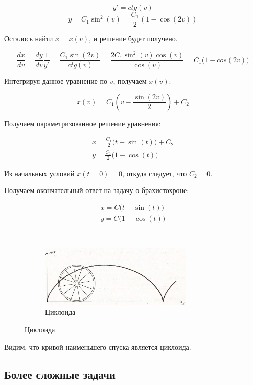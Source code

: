 \documentclass[12pt]{article}
\begin{document}
		$$y' = ctg(v)$$
		$$y = C_1 \sin^2(v) = \frac{C_1}{2}(1 - \cos(2v))$$

		Осталось найти $x = x(v)$, и решение будет получено.

		$$\frac{dx}{dv} = \frac{dy}{dv} \frac{1}{y'} = 
			\frac{C_1\sin(2v)}{ctg(v)} = \frac{2C_1 \sin^2(v)\cos(v)}{\cos(v)} = C_1\big(1 - cos(2v)\big)$$

		Интегрируя данное уравнение по $v$, получаем $x(v)$:

		$$x(v) = C_1\left(v - \frac{\sin(2v)}{2}\right) + C_2$$
	
		Получаем параметризованное решение уравнения:

		\begin{align*}
				x = \frac{C_1}{2} \big(t - \sin(t)\big) + C_2 \\
				y = \frac{C_1}{2} \big(1 - \cos(t)\big)
		\end{align*}
	
		Из начальных условий $x(t=0) = 0$, откуда следует, что $C_2 = 0$.

		Получаем окончательный ответ на задачу о брахистохроне:


		\begin{figure}[H]
			\begin{subfigure}[c]{0.5\textwidth}
			\begin{align*}
					x = C \big(t - \sin(t)\big) \\
					y = C \big(1 - \cos(t)\big)
			\end{align*}		
			\end{subfigure}
			~
			\begin{subfigure}[c]{0.5\textwidth}
					\includegraphics[width=0.8\textwidth]{../Graphics/Lectures-12-cycloid.png}
					\caption{\footnotesize Циклоида }
			\end{subfigure}
		\end{figure}
	
		Видим, что кривой наименьшего спуска является циклоида.

	\subsection{Более сложные задачи}
\end{document}
